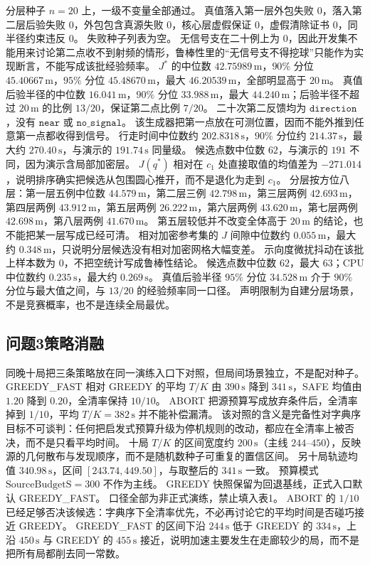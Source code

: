 分层种子 $n=20$ 上，一级不变量全部通过。
真值落入第一层外包失败 $0$，落入第二层后验失败 $0$，外包包含真源失败 $0$，核心层虚假保证 $0$，虚假清除证书 $0$，同半径约束违反 $0$。
失败种子列表为空。
无信号支在二十例上为 $0$，因此开发集不能用来讨论第二点收不到射频的情形，鲁棒性里的“无信号支不得挖球”只能作为实现断言，不能写成该批经验频率。
$J^\ast$ 的中位数 $42.75989\,\mathrm{m}$，$90\%$ 分位 $45.40667\,\mathrm{m}$，$95\%$ 分位 $45.48670\,\mathrm{m}$，最大 $46.20539\,\mathrm{m}$，全部明显高于 $20\,\mathrm{m}$。
真值后验半径的中位数 $16.041\,\mathrm{m}$，$90\%$ 分位 $33.988\,\mathrm{m}$，最大 $44.240\,\mathrm{m}$；后验半径不超过 $20\,\mathrm{m}$ 的比例 $13/20$，保证第二点比例 $7/20$。
二十次第二反馈均为 $\mathtt{direction}$，没有 $\mathtt{near}$ 或 $\mathtt{no\_signal}$。
该生成器把第一点放在可测位置，因而不能外推到任意第一点都收得到信号。
行走时间中位数约 $202.8318\,\mathrm{s}$，$90\%$ 分位约 $214.37\,\mathrm{s}$，最大约 $270.40\,\mathrm{s}$，与演示的 $191.74\,\mathrm{s}$ 同量级。
候选点数中位数 $62$，与演示的 $191$ 不同，因为演示含局部加密层。
$J(q^\ast)$ 相对在 $c_1$ 处直接取值的均值差为 $-271.014$，说明排序确实把候选从包围圆心推开，而不是退化为走到 $c_1$。
分层按方位八层：第一层五例中位数 $44.579\,\mathrm{m}$，第二层三例 $42.798\,\mathrm{m}$，第三层两例 $42.693\,\mathrm{m}$，第四层两例 $43.912\,\mathrm{m}$，第五层两例 $26.222\,\mathrm{m}$，第六层两例 $43.620\,\mathrm{m}$，第七层两例 $42.698\,\mathrm{m}$，第八层两例 $41.670\,\mathrm{m}$。
第五层较低并不改变全体高于 $20\,\mathrm{m}$ 的结论，也不能把某一层写成已经可清。
相对加密参考集的 $J$ 间隙中位数约 $0.055\,\mathrm{m}$，最大约 $0.348\,\mathrm{m}$，只说明分层候选没有相对加密网格大幅变差。
示向度微扰抖动在该批上样本数为 $0$，不把空统计写成鲁棒性结论。
候选点数中位数 $62$，最大 $63$；CPU 中位数约 $0.235\,\mathrm{s}$，最大约 $0.269\,\mathrm{s}$。
真值后验半径 $95\%$ 分位 $34.528\,\mathrm{m}$ 介于 $90\%$ 分位与最大值之间，与 $13/20$ 的经验频率同一口径。
声明限制为自建分层场景，不是竞赛概率，也不是连续全局最优。

\subsection{问题3策略消融}

同晚十局把三条策略放在同一演练入口下对照，但局间场景独立，不是配对种子。
GREEDY\_FAST 相对 GREEDY 的平均 $T/K$ 由 $390\,\mathrm{s}$ 降到 $341\,\mathrm{s}$，SAFE 均值由 $1.20$ 降到 $0.20$，全清率保持 $10/10$。
ABORT 把源预算写成放弃条件后，全清率掉到 $1/10$，平均 $T/K=382\,\mathrm{s}$ 并不能补偿漏清。
该对照的含义是完备性对字典序目标不可谈判：任何把启发式预算升级为停机规则的改动，都应在全清率上被否决，而不是只看平均时间。
十局 $T/K$ 的区间宽度约 $200\,\mathrm{s}$（主线 $244$--$450$），反映源的几何散布与发现顺序，而不是随机数种子可重复的置信区间。
另十局轨迹均值 $340.98\,\mathrm{s}$，区间 $[243.74,449.50]$，与取整后的 $341\,\mathrm{s}$ 一致。
预算模式 $\mathrm{SourceBudgetS}=300$ 不作为主线。
GREEDY 快照保留为回退基线，正式入口默认 GREEDY\_FAST。
口径全部为非正式演练，禁止填入表1。
ABORT 的 $1/10$ 已经足够否决该候选：字典序下全清率优先，不必再讨论它的平均时间是否碰巧接近 GREEDY。
GREEDY\_FAST 的区间下沿 $244\,\mathrm{s}$ 低于 GREEDY 的 $334\,\mathrm{s}$，上沿 $450\,\mathrm{s}$ 与 GREEDY 的 $455\,\mathrm{s}$ 接近，说明加速主要发生在走廊较少的局，而不是把所有局都削去同一常数。

